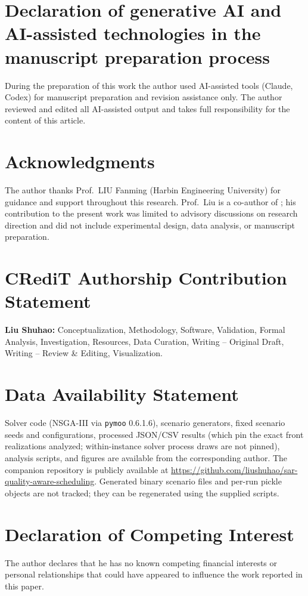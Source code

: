 \documentclass[preprint,12pt,authoryear]{elsarticle}
\begin{document}
\section*{Declaration of generative AI and AI-assisted technologies in the manuscript preparation process}
During the preparation of this work the author used AI-assisted
tools (Claude, Codex) for manuscript preparation and revision
assistance only. The author reviewed and edited all
AI-assisted output and takes full responsibility for the content
of this article.
\section*{Acknowledgments}
The author thanks Prof.\ LIU Fanming (Harbin Engineering University) for
guidance and support throughout this research. Prof.\ Liu is a co-author of
\citet{Wu2026WhaleHighDensity}; his contribution to the present work was limited
to advisory discussions on research direction and did not include experimental
design, data analysis, or manuscript preparation.
\section*{CRediT Authorship Contribution Statement}
\textbf{Liu Shuhao:} Conceptualization, Methodology, Software, Validation,
Formal Analysis, Investigation, Resources, Data Curation,
Writing -- Original Draft, Writing -- Review \& Editing, Visualization.
\section*{Data Availability Statement}
Solver code (NSGA-III via \texttt{pymoo} 0.6.1.6), scenario generators, fixed scenario seeds and configurations,
processed JSON/CSV results (which pin the exact front realizations analyzed; within-instance solver process draws
are not pinned), analysis scripts, and figures are available from the corresponding author. The companion repository
is publicly available at
\url{https://github.com/liushuhao/sar-quality-aware-scheduling}.
Generated binary scenario files and per-run pickle objects are not
tracked; they can be regenerated using the supplied scripts.
\section*{Declaration of Competing Interest}
The author declares that he has no known competing financial interests or
personal relationships that could have appeared to influence the work
reported in this paper.
\end{document}
